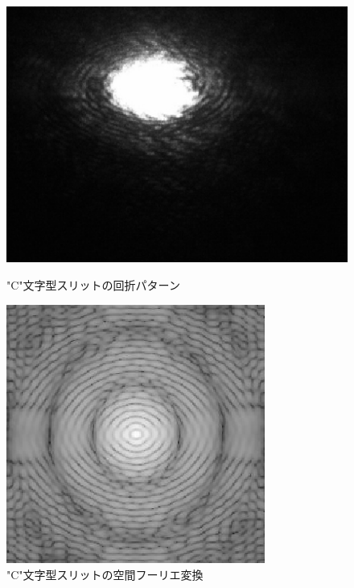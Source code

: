 \documentclass[11pt,a4]{jarticle}
\begin{document}
\begin{figure}[htbp]
 \begin{minipage}{0.55\hsize}
   \begin{center}
    \includegraphics[width=0.9\hsize]{./C_exp.eps}
    \caption{"C"文字型スリットの回折パターン}
     \label{fig:C_exp}
   \end{center}
 \end{minipage}
 \begin{minipage}{0.45\hsize}
   \begin{center}
    \includegraphics[width=0.9\hsize]{./C_comp.eps}
    \caption{"C"文字型スリットの空間フーリエ変換}
     \label{fig:C_comp}
   \end{center}
 \end{minipage}
\end{figure}
\end{document}
